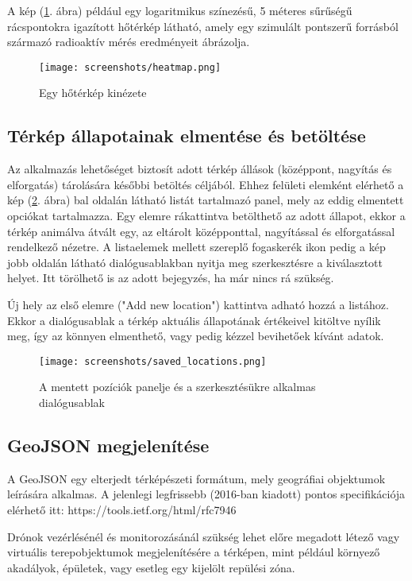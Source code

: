 A kép (\ref{fig:heatmap}. ábra) például egy logaritmikus színezésű, 5 méteres
sűrűségű rácspontokra igazított hőtérkép látható, amely egy szimulált pontszerű
forrásból származó radioaktív mérés eredményeit ábrázolja.

\begin{figure}[H]
  \texttt{[image: screenshots/heatmap.png]}
  \caption{Egy hőtérkép kinézete}
  \label{fig:heatmap}
\end{figure}


\subsection{Térkép állapotainak elmentése és betöltése}

Az alkalmazás lehetőséget biztosít adott térkép állások (középpont, nagyítás és
elforgatás) tárolására későbbi betöltés céljából. Ehhez felületi elemként
elérhető a kép (\ref{fig:saved_locations}. ábra) bal oldalán látható listát
tartalmazó panel, mely az eddig elmentett opciókat tartalmazza. Egy elemre
rákattintva betölthető az adott állapot, ekkor a térkép animálva átvált egy,
az eltárolt középponttal, nagyítással és elforgatással rendelkező nézetre. A
listaelemek mellett szereplő fogaskerék ikon pedig a kép jobb oldalán látható
dialógusablakban nyitja meg szerkesztésre a kiválasztott helyet. Itt törölhető
is az adott bejegyzés, ha már nincs rá szükség.

Új hely az első elemre ("Add new location") kattintva adható hozzá a
listához. Ekkor a dialógusablak a térkép aktuális állapotának értékeivel
kitöltve nyílik meg, így az könnyen elmenthető, vagy pedig kézzel bevihetőek
kívánt adatok.

\begin{figure}[H]
  \texttt{[image: screenshots/saved\_locations.png]}
  \caption{A mentett pozíciók panelje és a szerkesztésükre alkalmas dialógusablak}
  \label{fig:saved_locations}
\end{figure}


\subsection{GeoJSON megjelenítése}

A GeoJSON egy elterjedt térképészeti formátum, mely geográfiai objektumok
leírására alkalmas. A jelenlegi legfrissebb (2016-ban kiadott) pontos
specifikációja elérhető itt: https://tools.ietf.org/html/rfc7946

Drónok vezérlésénél és monitorozásánál szükség lehet előre megadott létező vagy
virtuális terepobjektumok megjelenítésére a térképen, mint például környező
akadályok, épületek, vagy esetleg egy kijelölt repülési zóna.


